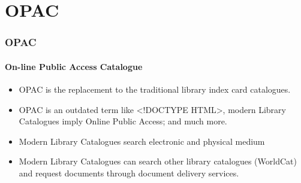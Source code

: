 \section{OPAC}

\begin{frame}
    \frametitle{OPAC}
    \framesubtitle{On-line Public Access Catalogue}
    \begin{itemize}
        \item OPAC is the replacement to the traditional library index card catalogues.
        \item OPAC is an outdated term like <!DOCTYPE HTML>, modern Library Catalogues imply Online Public Access; and much more.
        \item Modern Library Catalogues search electronic and physical medium
        \item Modern Library Catalogues can search other library catalogues (WorldCat) and request documents through document delivery services. 
    \end{itemize}
\end{frame}
